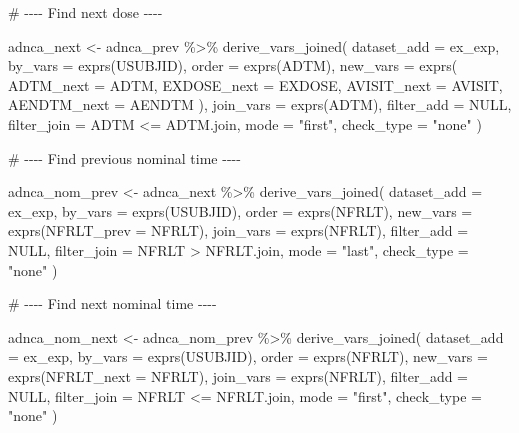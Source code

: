 \documentclass[
  letterpaper,
  DIV=11,
  numbers=noendperiod]{scrreprt}
\newenvironment{Shaded}{\begin{snugshade}}{\end{snugshade}}
\newcommand{\AttributeTok}[1]{\textcolor[rgb]{0.40,0.45,0.13}{#1}}
\newcommand{\CommentTok}[1]{\textcolor[rgb]{0.37,0.37,0.37}{#1}}
\newcommand{\ConstantTok}[1]{\textcolor[rgb]{0.56,0.35,0.01}{#1}}
\newcommand{\FunctionTok}[1]{\textcolor[rgb]{0.28,0.35,0.67}{#1}}
\newcommand{\NormalTok}[1]{\textcolor[rgb]{0.00,0.23,0.31}{#1}}
\newcommand{\OtherTok}[1]{\textcolor[rgb]{0.00,0.23,0.31}{#1}}
\newcommand{\SpecialCharTok}[1]{\textcolor[rgb]{0.37,0.37,0.37}{#1}}
\newcommand{\StringTok}[1]{\textcolor[rgb]{0.13,0.47,0.30}{#1}}
\begin{document}
\begin{Shaded}
\begin{Highlighting}[]
\CommentTok{\# {-}{-}{-}{-} Find next dose  {-}{-}{-}{-}}

\NormalTok{adnca\_next }\OtherTok{\textless{}{-}}\NormalTok{ adnca\_prev }\SpecialCharTok{\%\textgreater{}\%}
  \FunctionTok{derive\_vars\_joined}\NormalTok{(}
    \AttributeTok{dataset\_add =}\NormalTok{ ex\_exp,}
    \AttributeTok{by\_vars =} \FunctionTok{exprs}\NormalTok{(USUBJID),}
    \AttributeTok{order =} \FunctionTok{exprs}\NormalTok{(ADTM),}
    \AttributeTok{new\_vars =} \FunctionTok{exprs}\NormalTok{(}
      \AttributeTok{ADTM\_next =}\NormalTok{ ADTM, }
      \AttributeTok{EXDOSE\_next =}\NormalTok{ EXDOSE, }
      \AttributeTok{AVISIT\_next =}\NormalTok{ AVISIT,}
      \AttributeTok{AENDTM\_next =}\NormalTok{ AENDTM}
\NormalTok{    ),}
    \AttributeTok{join\_vars =} \FunctionTok{exprs}\NormalTok{(ADTM),}
    \AttributeTok{filter\_add =} \ConstantTok{NULL}\NormalTok{,}
    \AttributeTok{filter\_join =}\NormalTok{ ADTM }\SpecialCharTok{\textless{}=}\NormalTok{ ADTM.join,}
    \AttributeTok{mode =} \StringTok{"first"}\NormalTok{,}
    \AttributeTok{check\_type =} \StringTok{"none"}
\NormalTok{  )}

\CommentTok{\# {-}{-}{-}{-} Find previous nominal time {-}{-}{-}{-}}

\NormalTok{adnca\_nom\_prev }\OtherTok{\textless{}{-}}\NormalTok{ adnca\_next }\SpecialCharTok{\%\textgreater{}\%}
  \FunctionTok{derive\_vars\_joined}\NormalTok{(}
    \AttributeTok{dataset\_add =}\NormalTok{ ex\_exp,}
    \AttributeTok{by\_vars =} \FunctionTok{exprs}\NormalTok{(USUBJID),}
    \AttributeTok{order =} \FunctionTok{exprs}\NormalTok{(NFRLT),}
    \AttributeTok{new\_vars =} \FunctionTok{exprs}\NormalTok{(}\AttributeTok{NFRLT\_prev =}\NormalTok{ NFRLT),}
    \AttributeTok{join\_vars =} \FunctionTok{exprs}\NormalTok{(NFRLT),}
    \AttributeTok{filter\_add =} \ConstantTok{NULL}\NormalTok{,}
    \AttributeTok{filter\_join =}\NormalTok{ NFRLT }\SpecialCharTok{\textgreater{}}\NormalTok{ NFRLT.join,}
    \AttributeTok{mode =} \StringTok{"last"}\NormalTok{,}
    \AttributeTok{check\_type =} \StringTok{"none"}
\NormalTok{  )}

\CommentTok{\# {-}{-}{-}{-} Find next nominal time {-}{-}{-}{-}}

\NormalTok{adnca\_nom\_next }\OtherTok{\textless{}{-}}\NormalTok{ adnca\_nom\_prev }\SpecialCharTok{\%\textgreater{}\%}
  \FunctionTok{derive\_vars\_joined}\NormalTok{(}
    \AttributeTok{dataset\_add =}\NormalTok{ ex\_exp,}
    \AttributeTok{by\_vars =} \FunctionTok{exprs}\NormalTok{(USUBJID),}
    \AttributeTok{order =} \FunctionTok{exprs}\NormalTok{(NFRLT),}
    \AttributeTok{new\_vars =} \FunctionTok{exprs}\NormalTok{(}\AttributeTok{NFRLT\_next =}\NormalTok{ NFRLT),}
    \AttributeTok{join\_vars =} \FunctionTok{exprs}\NormalTok{(NFRLT),}
    \AttributeTok{filter\_add =} \ConstantTok{NULL}\NormalTok{,}
    \AttributeTok{filter\_join =}\NormalTok{ NFRLT }\SpecialCharTok{\textless{}=}\NormalTok{ NFRLT.join,}
    \AttributeTok{mode =} \StringTok{"first"}\NormalTok{,}
    \AttributeTok{check\_type =} \StringTok{"none"}
\NormalTok{  )}


\end{Highlighting}
\end{Shaded}
\end{document}
